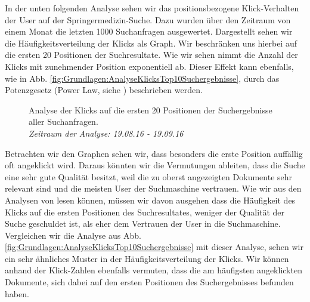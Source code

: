 
In der unten folgenden Analyse sehen wir das positionsbezogene Klick-Verhalten der User auf der Springermedizin-Suche. Dazu wurden über den Zeitraum von einem Monat die letzten 1000 Suchanfragen ausgewertet. Dargestellt sehen wir die Häufigkeitsverteilung der Klicks als Graph. Wir beschränken uns hierbei auf die ersten 20 Positionen der Suchresultate. Wie wir sehen nimmt die Anzahl der Klicks mit zunehmender Position exponentiell ab. Dieser Effekt kann ebenfalls, wie in Abb. \ref{fig:Grundlagen:AnalyseKlicksTop10Suchergebnisse}, durch das Potenzgesetz (Power Law, siehe \cite{PowerLaw}) beschrieben werden. 

\begin{figure}[H]
\centering 
\vspace{-1em}
\caption[Analyse der Klicks auf die ersten 20 Positionen der Suchergebnisse aller Suchanfragen. \textit{Zeitraum der Analyse: 19.08.16 - 19.09.16}]{Analyse der Klicks auf die ersten 20 Positionen der Suchergebnisse aller Suchanfragen. \\ \textit{Zeitraum der Analyse: 19.08.16 - 19.09.16}}
\label{fig:Grundlage:AnalyseKlicksPositionen}

\footnotesize
{}\topRanks
  

\vspace{-2em}
\end{figure}

Betrachten wir den Graphen sehen wir, dass besonders die erste Position auffällig oft angeklickt wird. Daraus könnten wir die Vermutungen ableiten, dass die Suche eine sehr gute Qualität besitzt, weil die zu oberst angezeigten Dokumente sehr relevant sind und die meisten User der Suchmaschine vertrauen. Wie wir aus den Analysen von \cite{Joachims} lesen können, müssen wir davon ausgehen dass die Häufigkeit des Klicks auf die ersten Positionen des Suchresultates, weniger der Qualität der Suche geschuldet ist, als eher dem Vertrauen der User in die Suchmaschine. Vergleichen wir die Analyse aus Abb. \ref{fig:Grundlagen:AnalyseKlicksTop10Suchergebnisse} mit dieser Analyse, sehen wir ein sehr ähnliches Muster in der Häufigkeitsverteilung der Klicks. Wir können anhand der Klick-Zahlen ebenfalls vermuten, dass die am häufigsten angeklickten Dokumente, sich dabei auf den ersten Positionen des Suchergebnisses befunden haben.